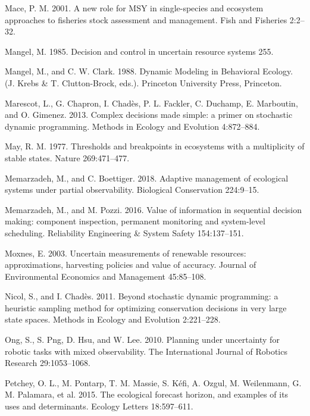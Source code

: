\documentclass[3p]{elsarticle} %
\begin{document}
\leavevmode\hypertarget{ref-Mace2001}{}%
Mace, P. M. 2001. A new role for MSY in single-species and ecosystem
approaches to fisheries stock assessment and management. Fish and
Fisheries 2:2--32.

\leavevmode\hypertarget{ref-Mangel1985}{}%
Mangel, M. 1985. Decision and control in uncertain resource systems 255.

\leavevmode\hypertarget{ref-Mangel1988}{}%
Mangel, M., and C. W. Clark. 1988. Dynamic Modeling in Behavioral
Ecology. (J. Krebs \& T. Clutton-Brock, eds.). Princeton University
Press, Princeton.

\leavevmode\hypertarget{ref-Marescot2013}{}%
Marescot, L., G. Chapron, I. Chadès, P. L. Fackler, C. Duchamp, E.
Marboutin, and O. Gimenez. 2013. Complex decisions made simple: a primer
on stochastic dynamic programming. Methods in Ecology and Evolution
4:872--884.

\leavevmode\hypertarget{ref-May1977}{}%
May, R. M. 1977. Thresholds and breakpoints in ecosystems with a
multiplicity of stable states. Nature 269:471--477.

\leavevmode\hypertarget{ref-Memarzadeh2018}{}%
Memarzadeh, M., and C. Boettiger. 2018. Adaptive management of
ecological systems under partial observability. Biological Conservation
224:9--15.

\leavevmode\hypertarget{ref-Memarzadeh2016b}{}%
Memarzadeh, M., and M. Pozzi. 2016. Value of information in sequential
decision making: component inspection, permanent monitoring and
system-level scheduling. Reliability Engineering \& System Safety
154:137--151.

\leavevmode\hypertarget{ref-Moxnes2003}{}%
Moxnes, E. 2003. Uncertain measurements of renewable resources:
approximations, harvesting policies and value of accuracy. Journal of
Environmental Economics and Management 45:85--108.

\leavevmode\hypertarget{ref-Nicol2011}{}%
Nicol, S., and I. Chadès. 2011. Beyond stochastic dynamic programming: a
heuristic sampling method for optimizing conservation decisions in very
large state spaces. Methods in Ecology and Evolution 2:221--228.

\leavevmode\hypertarget{ref-Ong2010}{}%
Ong, S., S. Png, D. Hsu, and W. Lee. 2010. Planning under uncertainty
for robotic tasks with mixed observability. The International Journal of
Robotics Research 29:1053--1068.

\leavevmode\hypertarget{ref-Petchy2015}{}%
Petchey, O. L., M. Pontarp, T. M. Massie, S. Kéfi, A. Ozgul, M.
Weilenmann, G. M. Palamara, et al. 2015. The ecological forecast
horizon, and examples of its uses and determinants. Ecology Letters
18:597--611.
\end{document}
